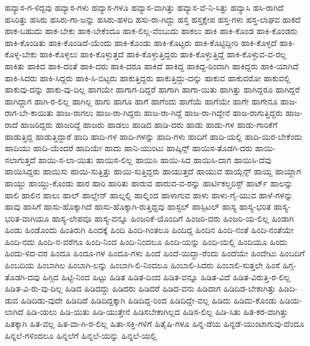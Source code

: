 {ಹವ್ಯಾಸ-ಗ-ಳಿದ್ದವು
ಹವ್ಯಾಸ-ಗಳು
ಹವ್ಯಾಸ-ಗಳೂ
ಹವ್ಯಾಸ-ವಾಗಿತ್ತು
ಹವ್ಯಾಸ-ವೆ-ನಿ-ಸಿತ್ತು
ಹವ್ಯಾಸಿ
ಹಸಿ-ರಾಗಿದೆ
ಹಸಿರಿತ್ತು
ಹಸಿರು
ಹಸಿರು-ಗಾ-ಜನ್ನು
ಹಸಿರು-ಹಳದಿ
ಹಸು-ರಾ-ಗಿದ್ದು
ಹಸ್ತ
ಹಸ್ತಕ್ಷೇಪ
ಹಸ್ತ-ಗಳು
ಹಸ್ತ-ಲಾಘವ
ಹಾಕದೆ
ಹಾಕ-ಬಹುದು
ಹಾಕ-ಬೇಕು
ಹಾಕ-ಬೇಕೆಂದೂ
ಹಾಕ-ಲಿಲ್ಲ-ವೆಂಬುದು
ಹಾಕಲು
ಹಾಕಿ
ಹಾಕಿ-ಕೊಂಡ
ಹಾಕಿ-ಕೊಂಡರು
ಹಾಕಿ-ಕೊಂಡಿತು
ಹಾಕಿ-ಕೊಂಡಿದೆ-ಯೆಂದು
ಹಾಕಿ-ಕೊಂಡು
ಹಾಕಿ-ಕೊಟ್ಟರು
ಹಾಕಿ-ಕೊಟ್ಟಿದ್ದೀರಿ
ಹಾಕಿ-ಕೊಳ್ಳದೆ
ಹಾಕಿ-ಕೊಳ್ಳ-ಬೇಕು
ಹಾಕಿ-ಕೊಳ್ಳಲು
ಹಾಕಿ-ಕೊಳ್ಳುತ್ತದೆ
ಹಾಕಿ-ಕೊಳ್ಳುತ್ತಿದ್ದರು
ಹಾಕಿ-ಕೊಳ್ಳುತ್ತಿದ್ದೆ
ಹಾಕಿ-ಕೊಳ್ಳುವ-ವ-ರಲ್ಲ
ಹಾಕಿತು
ಹಾಕಿದ
ಹಾಕಿ-ದಂತೆ
ಹಾಕಿ-ದರು
ಹಾಕಿ-ದರೂ
ಹಾಕಿದೆ
ಹಾಕಿದ್ದ
ಹಾಕಿದ್ದ-ರಿಂದಾಗಿ
ಹಾಕಿದ್ದರು
ಹಾಕಿ-ಯಾಗಿದೆ
ಹಾಕಿ-ಸಿದರು
ಹಾಕಿ-ಸಿದ್ದರು
ಹಾಕಿ-ಸಿ-ಬಿಟ್ಟರು
ಹಾಕುತ್ತಿದ್ದರು
ಹಾಕುತ್ತಿದ್ದು-ದನ್ನು
ಹಾಕುವ
ಹಾಕುವರೋ
ಹಾಕುವಲ್ಲಿ
ಹಾಕುವು-ದನ್ನು
ಹಾಕು-ವು-ದಿಲ್ಲ
ಹಾಗಯೇ
ಹಾಗಾಗ-ದಿದ್ದರೆ
ಹಾಗಾಗಿ
ಹಾಗಾ-ಯಿತು
ಹಾಗಿತ್ತು
ಹಾಗಿದ್ದರೂ
ಹಾಗಿದ್ದರೆ
ಹಾಗಿದ್ದಾಗ
ಹಾಗಿ-ರ-ಲಿಲ್ಲ
ಹಾಗಿಲ್ಲ
ಹಾಗು
ಹಾಗೂ
ಹಾಗೆ
ಹಾಗೆಂದು
ಹಾಗೆಯೆ
ಹಾಗೆಯೇ
ಹಾಗೇ
ಹಾಗೇನೂ
ಹಾಜ-ರಾಗ-ಬೇ-ಕಾಯಿತು
ಹಾಜ-ರಾಗಲು
ಹಾಜ-ರಾ-ಗಿದ್ದರು
ಹಾಜ-ರಾ-ಗಿದ್ದೆ
ಹಾಜ-ರಾ-ಗಿದ್ದೇನೆ
ಹಾಜ-ರಾಗುತ್ತಿದ್ದರು
ಹಾಜ-ರಾದೆ
ಹಾಜರಿದ್ದರು
ಹಾಜರಿದ್ದೆ
ಹಾಜರು
ಹಾಡಲು
ಹಾಡಿದ
ಹಾಡಿ-ದರು
ಹಾಡು
ಹಾಡು-ಗಳ
ಹಾಡು-ಗಾರಿಕೆಗೆ
ಹಾಡುತ್ತಿದ್ದ
ಹಾಡುತ್ತಿದ್ದಾರೆ
ಹಾದಿ
ಹಾದಿ-ಗಳ
ಹಾದಿ-ಗಳನ್ನು
ಹಾದಿ-ಗಳು
ಹಾದಿಗೆ
ಹಾದಿ-ಯಲ್ಲಿ
ಹಾದಿ-ಯಿರ-ಬೇಕೆಂದು
ಹಾದಿಯು
ಹಾದಿ-ಯೆಂದರೆ
ಹಾದಿಯೇ
ಹಾದು
ಹಾನಿ-ಯುಂಟು
ಹಾಪ್ಕಿನ್ಸ್
ಹಾಯಿಸ-ತೊಡಗಿ-ದರು
ಹಾಯಿ-ಸಲಾಗುತ್ತದೆ
ಹಾಯಿ-ಸ-ಲಾ-ಯಿತು
ಹಾಯಿಸ-ಲಿಲ್ಲ
ಹಾಯಿಸಿ
ಹಾಯಿ-ಸಿದ
ಹಾಯಿಸಿ-ದಾಗ
ಹಾಯಿಸಿ-ದೆವು
ಹಾಯಿಸಿದ್ದರು
ಹಾಯಿಸು
ಹಾಯಿ-ಸುತ್ತಿತ್ತು
ಹಾಯಿ-ಸುತ್ತಿದ್ದರು
ಹಾಯುತ್ತದೆ
ಹಾಯುವ
ಹಾಯ್ಗೆನ್ಸ್
ಹಾಯ್ದ
ಹಾಯ್ದಾಗ
ಹಾಯ್ದು
ಹಾಯ್ದು-ಕೊಂಡು
ಹಾರ
ಹಾರಿ
ಹಾರಿತು
ಹಾರುವ
ಹಾರುವ-ವ-ರನ್ನು
ಹಾರ್ಟಿಕಲ್ಚರಿಸ್ಟ್
ಹಾರ್ಟ್
ಹಾಲನ್ನು
ಹಾಲಿ
ಹಾಲಿನ
ಹಾಲು
ಹಾಲ್
ಹಾಲ್ಡೇನ್
ಹಾಲ್ನಲ್ಲಿ
ಹಾಲ್ನಿಂದ
ಹಾಳಾಗುವ
ಹಾಳು
ಹಾಳು-ಗೈ-ಯುವ
ಹಾಳೆ-ಗಳನ್ನು
ಹಾವು
ಹಾಸಿಗೆ
ಹಾಸು-ಹೊಕ್ಕಾಗಿದೆ
ಹಾಸು-ಹೊಕ್ಕಾಗಿ-ರುತ್ತಿದ್ದವು
ಹಾಸ್ಟಲ್
ಹಾಸ್ಪಿಟಲ್
ಹಾಸ್ಯ
ಹಾಸ್ಯ-ಭರಿತ
ಹಾಸ್ಯ-ಭರಿತ-ವಾಗಿಯೂ
ಹಾಸ್ಯ-ಲೇಪವೂ
ಹಾಸ್ಯ-ವನ್ನೂ
ಹಿಂಜರಿಕೆ-ಯೊಂದಿಗೆ
ಹಿಂಜರಿ-ದರು
ಹಿಂಜರಿ-ಯ-ಲಿಲ್ಲ
ಹಿಂಡಾಗಿ
ಹಿಂಡು
ಹಿಂಡೊಂದು
ಹಿಂತಿರುಗಿ
ಹಿಂದಕ್ಕೆ
ಹಿಂದಿ
ಹಿಂದಿ-ಗಿಂತಲೂ
ಹಿಂದಿದ್ದ
ಹಿಂದಿನ
ಹಿಂದಿ-ನಂತೆ
ಹಿಂದಿ-ನಂತೆಯೇ
ಹಿಂದಿ-ನದು
ಹಿಂದಿ-ನ-ವರೆಗೂ
ಹಿಂದಿ-ನಿಂದ
ಹಿಂದಿ-ನಿಂದಲೂ
ಹಿಂದಿ-ಯನ್ನು
ಹಿಂದಿ-ಯಲ್ಲಿ
ಹಿಂದಿಯೂ
ಹಿಂದು
ಹಿಂದು-ಳಿದ-ವರ
ಹಿಂದೂ
ಹಿಂದೂ-ಗಳ
ಹಿಂದೂ-ಗಳು
ಹಿಂದೆ
ಹಿಂದೆ-ಯಿದ್ದಾ-ರೆಂದು
ಹಿಂದೆಯೇ
ಹಿಂದೇಟು
ಹಿಂಬದಿಗೆ
ಹಿಂಬದಿಯ
ಹಿಂಬಾಗಿಲ
ಹಿಂಬಾಗಿ-ಲನ್ನು
ಹಿಂಬಾಗಿ-ಲಿ-ನಿಂದಲೂ
ಹಿಂಬಾಲಿ-ಸಿದರು
ಹಿಂಬಾಲಿ-ಸುತ್ತಲೇ
ಹಿಂಸೆ
ಹಿಗ್ಗ-ತೊಡಗಿ-ದವು
ಹಿಗ್ಗಿದ
ಹಿಟ್ಟಿ-ನಿಂದ
ಹಿಟ್ಟು
ಹಿಡಿತ
ಹಿಡಿತ-ದಿಂದ
ಹಿಡಿತ-ವನ್ನೂ
ಹಿಡಿತ-ವಿದೆ
ಹಿಡಿತ-ವಿರುತ್ತಿ-ರ-ಲಿಲ್ಲ
ಹಿಡಿತ-ವಿ-ರು-ವು-ದಿಲ್ಲ
ಹಿಡಿದ
ಹಿಡಿದದ್ದು
ಹಿಡಿದರು
ಹಿಡಿದರೆ
ಹಿಡಿದ-ವನು
ಹಿಡಿದಾಗ
ಹಿಡಿದಿಡ-ಬೇಕಾಗಿತ್ತು
ಹಿಡಿದಿ-ಡುವ
ಹಿಡಿದಿಡು-ವುದೇ
ಹಿಡಿದಿದೆ
ಹಿಡಿದಿದ್ದಕ್ಕಾಗಿ
ಹಿಡಿದಿದ್ದ-ರಿಂದ
ಹಿಡಿದಿದ್ದೇ-ವಲ್ಲ
ಹಿಡಿದು
ಹಿಡಿದು-ಕೊಂಡು
ಹಿಡಿಯ-ಲಾಗಿದೆ
ಹಿಡಿ-ಯಲು
ಹಿಡಿ-ಯಿತು
ಹಿಡಿ-ಯುತ್ತೇನೆ
ಹಿಡಿಸಬೇಕಾಗಿಲ್ಲದ
ಹಿಡಿಸ-ಲಿಲ್ಲ
ಹಿಡಿ-ಸಿತು
ಹಿತ-ಕರ-ವಾಗಿತ್ತು
ಹಿತಕ್ಕಾಗಿ
ಹಿತ-ವಲ್ಲ
ಹಿತ-ವಾ-ಗಿ-ರ-ಲಿಲ್ಲ
ಹಿತಾ-ಸಕ್ತಿ-ಗಳಿಗೆ
ಹಿತೈಷಿ-ಗಳೂ
ಹಿನ್ನ-ಡೆಯ
ಹಿನ್ನಡೆ-ಯುಂಟಾಗುವು-ದೆಂದೂ
ಹಿನ್ನಲೆ-ಗಳಿಂದಲೂ
ಹಿನ್ನಲೆಗೆ
ಹಿನ್ನಲೆ-ಯನ್ನು
ಹಿನ್ನಲೆ-ಯಲ್ಲಿ
}
